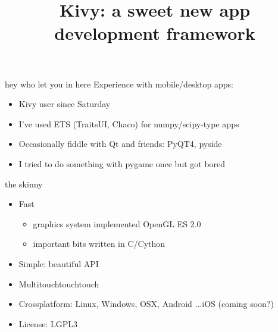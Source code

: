 \documentclass{beamer}
\title[Kivy]{Kivy: a sweet new app development framework}
\begin{document}
\begin{frame}[plain]
  \titlepage
\end{frame}


\begin{frame}{hey who let you in here}
Experience with mobile/desktop apps:

\pause
\begin{itemize}
  \item Kivy user since Saturday
  \pause
  \item I've used ETS (TraitsUI, Chaco) for numpy/scipy-type apps
  \pause
  \item Occasionally fiddle with Qt and friends: PyQT4, pyside
  \pause
  \item I tried to do something with pygame once but got bored
\end{itemize}
\end{frame}


\begin{frame}{the skinny}

\begin{itemize}
  \item Fast
    \pause
    \begin{itemize}
    \item graphics system implemented OpenGL ES 2.0
    \pause
    \item important bits written in C/Cython
    \end{itemize}
  \pause
  \item Simple: beautiful API
  \pause
  \item Multitouchtouchtouch
  \pause
  \item Crossplatform: Linux, Windows, OSX, Android
  \pause
  ...iOS (coming soon?)
  \pause
  \item License: LGPL3
\end{itemize}

\end{frame}
\end{document}
